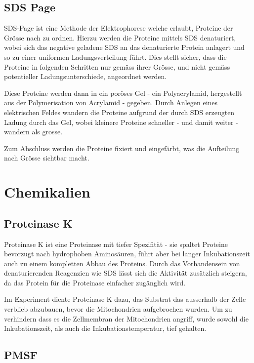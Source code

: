 \documentclass[a4paper,german]{scrreprt}
\begin{document}
\section{SDS Page}

SDS-Page ist eine Methode der Elektrophorese welche erlaubt, Proteine der
Grösse nach zu ordnen. Hierzu werden die Proteine mittels SDS denaturiert,
wobei sich das negative geladene SDS an das denaturierte Protein anlagert und
so zu einer uniformen Ladungsverteilung führt. Dies stellt sicher, dass die
Proteine in folgenden Schritten nur gemäss ihrer Grösse, und nicht gemäss
potentieller Ladungsunterschiede, angeordnet werden.

Diese Proteine werden dann in ein poröses Gel - ein Polyacrylamid, hergestellt
aus der Polymerisation von Acrylamid - gegeben. Durch Anlegen eines
elektrischen Feldes wandern die Proteine aufgrund der durch SDS erzeugten
Ladung durch das Gel, wobei kleinere Proteine schneller - und damit weiter -
wandern als grosse.

Zum Abschluss werden die Proteine fixiert und eingefärbt, was die Aufteilung
nach Grösse sichtbar macht.

\chapter{Chemikalien}

\section{Proteinase K}

Proteinase K ist eine Proteinase mit tiefer Spezifität - sie spaltet Proteine
bevorzugt nach hydrophoben Aminosäuren, führt aber bei langer Inkubationszeit
auch zu einem kompletten Abbau des Proteins. Durch das Vorhandensein von
denaturierenden Reagenzien wie SDS lässt sich die Aktivität zusätzlich
steigern, da das Protein für die Proteinase einfacher zugänglich wird. \cite{stimulation_proteinase}

Im Experiment diente Proteinase K dazu, das Substrat das ausserhalb der Zelle
verblieb abzubauen, bevor die Mitochondrien aufgebrochen wurden. Um zu
verhindern dass es die Zellmembran der Mitochondrien angriff, wurde sowohl die
Inkubationszeit, als auch die Inkubationstemperatur, tief gehalten.

\section{PMSF}
\end{document}

